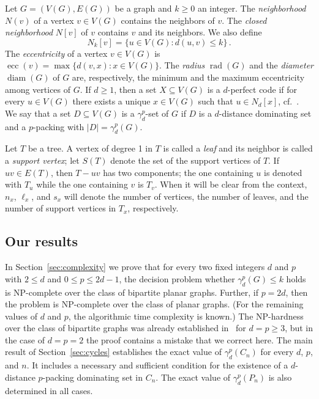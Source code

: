 \documentclass[12pt]{article}
\DeclareMathOperator{\diam}{diam}
\DeclareMathOperator{\rad}{rad}
\DeclareMathOperator{\ecc}{ecc}
\begin{document}
Let $G = (V(G), E(G))$ be a graph and $k \geq 0$ an integer. The \emph{neighborhood} $N(v)$ of a vertex $v \in V(G)$ contains the neighbors of $v$. The \emph{closed neighborhood} $N[v]$ of $v$ contains $v$ and its neighbors. We also define 
$$N_k[v]= \{u \in V(G): d(u,v) \leq k\}\,.$$ 
The \emph{eccentricity} of a vertex $v \in V(G)$ is $\ecc(v) = \max \{ d(v, x): x \in V(G) \}$. The \emph{radius} $\rad(G)$ and the \emph{diameter} $\diam(G)$ of $G$ are, respectively, the minimum and the maximum eccentricity among vertices of $G$. If $d\ge 1$, then a set $X\subseteq V(G)$ is a $d$-perfect code if for every $u\in V(G)$ there exists a unique $x\in V(G)$ such that $u\in N_d[x]$, cf.~\cite{taylor-2009}. We say that a set $D\subseteq V(G)$ is a $\gamma_d^p$-set of $G$ if $D$ is a $d$-distance dominating set and a $p$-packing with $|D| = \gamma_d^p(G)$.

Let $T$ be a tree. A vertex of degree 1 in $T$ is called a \emph{leaf} and its neighbor is called a \emph{support vertex}; let $S(T)$ denote the set of the support vertices of  $T$. If $uv \in E(T)$, then $T-uv$ has two components; the one containing $u$ is denoted with $T_u$ while the one containing $v$ is $T_v$. When it will be clear from the context, $n_x$, $\ell_x$, and $s_x$ will denote the number of vertices, the number of leaves, and the number of support vertices in $T_x$, respectively. 

\subsection{Our results}

In Section~\ref{sec:complexity} we prove that for every two fixed integers $d$ and $p$ with $2 \le d$ and $0 \le p \leq 2d-1$, the decision problem whether $\gamma_d^p(G) \leq k$ holds is NP-complete over the class of bipartite planar graphs. Further, if $p=2d$, then the problem is NP-complete over the class of planar graphs.  (For the remaining values of $d$ and $p$, the algorithmic time complexity is known.) The NP-hardness over the class of bipartite graphs was already established in~\cite{Fricke} for $d=p \ge 3$, but in the case of $d=p=2$ the proof contains a mistake that we correct here. The main result of Section~\ref{sec:cycles} establishes  the exact value of $\gamma_d^p(C_n)$ for every $d$, $p$, and $n$. It includes a necessary and sufficient condition for the existence of a $d$-distance $p$-packing dominating set in $C_n$. The exact value of $\gamma_d^p(P_n)$ is also determined in all cases.
\end{document}
